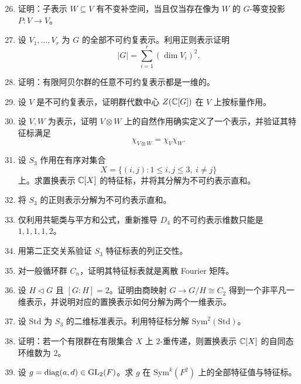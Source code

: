 \begin{enumerate}[label={\textbf{习题8.\arabic*.}}, wide=0pt, leftmargin=3.2em]
\setcounter{enumi}{25}

\item \medium 证明：子表示 $W\subseteq V$ 有不变补空间，当且仅当存在像为 $W$ 的 $G$-等变投影 $P:V\to V$。

\item \medium 设 $V_1,\dots,V_r$ 为 $G$ 的全部不可约复表示。利用正则表示证明
\[
|G|=\sum_{i=1}^r (\dim V_i)^2.
\]

\item \medium 证明：有限阿贝尔群的任意不可约复表示都是一维的。

\item \medium 设 $V$ 是不可约复表示，证明群代数中心 $Z(\mathbb{C}[G])$ 在 $V$ 上按标量作用。

\item \medium 设 $V,W$ 为表示，证明 $V\otimes W$ 上的自然作用确实定义了一个表示，并验证其特征标满足
\[
\chi_{V\otimes W}=\chi_V\chi_W.
\]

\item \medium 设 $S_3$ 作用在有序对集合
\[
X=\{(i,j):1\le i,j\le 3,\ i\neq j\}
\]
上。求置换表示 $\mathbb{C}[X]$ 的特征标，并将其分解为不可约表示直和。

\item \medium 将 $S_3$ 的正则表示分解为不可约表示直和。

\item \medium 仅利用共轭类与平方和公式，重新推导 $D_4$ 的不可约表示维数只能是 $1,1,1,1,2$。

\item \medium 用第二正交关系验证 $S_3$ 特征标表的列正交性。

\item \medium 对一般循环群 $C_n$，证明其特征标表就是离散 Fourier 矩阵。

\item \medium 设 $H\triangleleft G$ 且 $[G:H]=2$。证明由商映射 $G\to G/H\cong C_2$ 得到一个非平凡一维表示，并说明对应的置换表示如何分解为两个一维表示。

\item \medium 设 $\mathrm{Std}$ 为 $S_3$ 的二维标准表示。利用特征标分解 $\mathrm{Sym}^2(\mathrm{Std})$。

\item \medium 证明：若一个有限群在有限集合 $X$ 上 $2$-重传递，则置换表示 $\mathbb{C}[X]$ 的自同态环维数为 $2$。

\item \medium 设 $g=\mathrm{diag}(a,d)\in \mathrm{GL}_2(F)$。求 $g$ 在 $\mathrm{Sym}^k(F^2)$ 上的全部特征值与特征标。


\end{enumerate}
